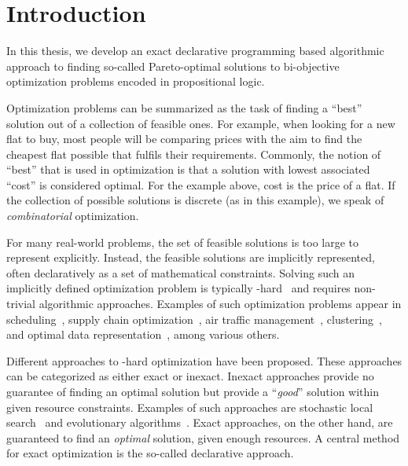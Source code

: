 \chapter{Introduction\label{chap:intro}}

In this thesis, we develop an exact declarative programming based algorithmic approach to finding so-called Pareto-optimal solutions to bi-objective optimization problems encoded in propositional logic.

Optimization problems can be summarized as the task of finding a ``best'' solution out of a collection of feasible ones.
For example, when looking for a new flat to buy, most people will be comparing prices with the aim to find the cheapest flat possible that fulfils their requirements.
Commonly, the notion of ``best'' that is used in optimization is that a solution with lowest associated ``cost'' is considered optimal.
For the example above, cost is the price of a flat.
If the collection of possible solutions is discrete (as in this example), we speak of \emph{combinatorial} optimization.

For many real-world problems, the set of feasible solutions is too large to represent explicitly.
Instead, the feasible solutions are implicitly represented, often declaratively as a set of mathematical constraints.
Solving such an implicitly defined optimization problem is typically \NP-hard~\autocite{AroraBarak2009-complexity} and requires non-trivial algorithmic approaches.
Examples of such optimization problems appear in scheduling~\autocites{DBLP:conf/cp/Stojadinovic14,DBLP:conf/cpaior/BofillGSV15,DBLP:journals/ior/Solomon87,DBLP:journals/candie/AkyolB07}, supply chain optimization~\autocite{DBLP:journals/cce/Papageorgiou09}, air traffic management~\autocites{DBLP:journals/ior/BertsimasLO11,RichardsHow2002Aircrafttrajectoryplanning}, clustering~\autocite{DBLP:journals/ai/DaoDV17,DBLP:conf/sdm/DavidsonRS10}, and optimal data representation~\autocites{DBLP:conf/cp/MaliotovM18,DBLP:conf/ijcai/NarodytskaIPM18,DBLP:conf/ijcai/Hu0HH20,DBLP:conf/cp/YuISB20,DBLP:conf/aaai/DemirovicS21,DBLP:conf/cp/ShatiCM21,DBLP:conf/cade/IgnatievPNM18}, among various others.

Different approaches to \NP-hard optimization have been proposed.
These approaches can be categorized as either exact or inexact.
Inexact approaches provide no guarantee of finding an optimal solution but provide a ``\emph{good}'' solution within given resource constraints.
Examples of such approaches are stochastic local search~\autocite{DBLP:books/daglib/0017492} and evolutionary algorithms~\autocite{DBLP:books/daglib/0087893,DBLP:journals/jgo/StornP97}.
Exact approaches, on the other hand, are guaranteed to find an \emph{optimal} solution, given enough resources.
A central method for exact optimization is the so-called declarative approach.

